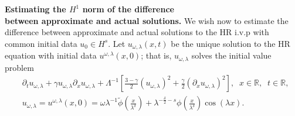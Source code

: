 \documentclass[12pt,reqno]{amsart}
\newcommand{\rr}{\mathbb{R}}
\newcommand{\p}{\partial}
\theoremstyle{plain}  %
\theoremstyle{definition}
\begin{document}
%
%
%
%
%
{\bf Estimating the $H^1$ norm of the difference \\
between approximate and actual
	solutions.}
	\vskip0.1in
	We wish now to estimate the difference between approximate and actual solutions to
	the HR i.v.p with common initial data $u_0 \in H^s$. Let
	$u_{\omega,\lambda}(x,t)$ be the unique solution to the HR equation
	with initial data $u^{\omega,\lambda}(x,0)$; that is,
	$u_{\omega,\lambda}$ solves the initial value problem
	\begin{align}
		& \p_t u_{\omega,\lambda} + \gamma u_{\omega,\lambda} \p_x u_{\omega,\lambda} + \Lambda^{-1} \left[
		\frac{3- \gamma}{2}\left( u_{\omega,\lambda} \right)^2 + \frac{\gamma}{2}\left(
		\p_x u_{\omega,\lambda} \right)^2
		\right], \; \; x\in \rr, \; \; t \in \rr,
		\label{apple50}
		\\
		& u_{\omega,\lambda} = u^{\omega,\lambda}(x,0)=\omega \lambda^{-1}
		\tilde{\phi} \left( \frac{x}{\lambda^\delta} \right)
		+ \lambda^{-\frac{\delta}{2} -s}
		\phi\left( \frac{x}{\lambda^\delta} \right) \cos(\lambda x).
		\label{apple41}
	\end{align}
\end{document}

